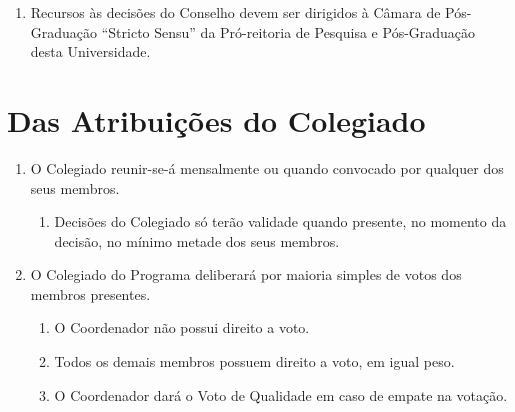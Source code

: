 \documentclass{article}
\newcommand{\singleitem}{\item[Parágrafo Único.]}
\newcommand{\grupoMenor}{Colegiado\xspace}
\newcommand{\grupoMaior}{Conselho\xspace}
\begin{document}
\begin{enumerate}
	\begin{enumerate}
		\singleitem Recursos às decisões do \grupoMaior devem ser dirigidos à Câmara de Pós-Graduação ``Stricto Sensu'' da Pró-reitoria de Pesquisa e Pós-Graduação desta Universidade.
	\end{enumerate}
\end{enumerate}

\section{Das Atribuições do \grupoMenor}
\begin{enumerate}

	\item O \grupoMenor reunir-se-á mensalmente ou quando convocado por qualquer dos seus membros.
	\begin{enumerate}
		\singleitem Decisões do \grupoMenor só terão validade quando presente, no momento da decisão, no mínimo metade dos seus membros.
	\end{enumerate}

	\item O \grupoMenor do Programa deliberará por maioria simples de votos dos membros presentes.
	\begin{enumerate}
		\item O Coordenador não possui direito a voto.
		\item Todos os demais membros possuem direito a voto, em igual peso.
		\item O Coordenador dará o Voto de Qualidade em caso de empate na votação. 
	\end{enumerate}


\end{enumerate}
\end{document}
